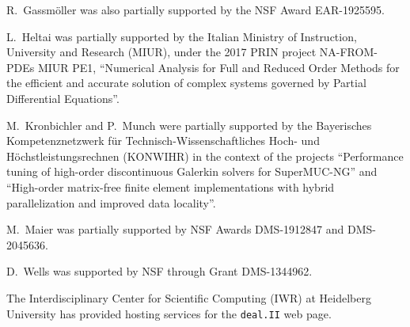 \documentclass{ansarticle-preprint}
\newcommand{\specialword}[1]{\texttt{#1}}
\newcommand{\dealii}{{\specialword{deal.II}}\xspace}
\begin{document}
R.~Gassm{\"o}ller was also partially supported by the NSF Award
EAR-1925595.

L.~Heltai was partially supported by the Italian Ministry of Instruction,
University and Research (MIUR), under the 2017 PRIN project NA-FROM-PDEs MIUR
PE1, ``Numerical Analysis for Full and Reduced Order Methods for the efficient
and accurate solution of complex systems governed by Partial Differential
Equations''.

M.~Kronbichler and P.~Munch were partially supported by the
Bayerisches Kompetenznetzwerk
f\"ur Technisch-Wissen\-schaft\-li\-ches Hoch- und H\"ochstleistungsrechnen
(KONWIHR) in the context of the projects
``Performance tuning of high-order discontinuous Galerkin solvers for
SuperMUC-NG'' and ``High-order matrix-free finite element implementations with
hybrid parallelization and improved data locality''.

M.~Maier was partially supported by NSF Awards DMS-1912847 and DMS-2045636.

D.~Wells was supported by NSF through Grant DMS-1344962.

The Interdisciplinary Center for Scientific Computing (IWR) at Heidelberg
University has provided hosting services for the \dealii{} web page.

{}

\end{document}
